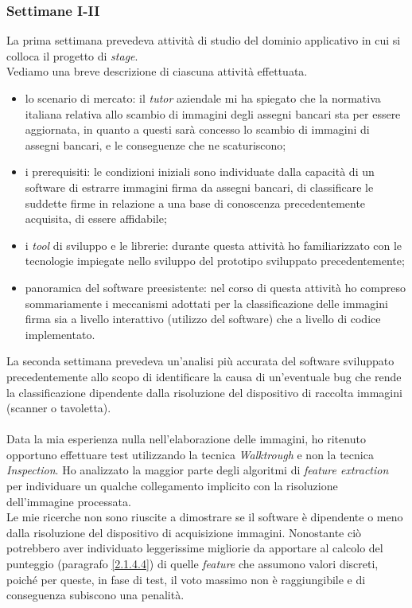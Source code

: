\subsubsection{Settimane I-II}
\label{3.1.1}
La prima settimana prevedeva attività di studio del dominio applicativo in cui si colloca il progetto di \emph{stage}.\\
Vediamo una breve descrizione di ciascuna attività effettuata.
\begin{itemize}
\item lo scenario di mercato: il \emph{tutor} aziendale mi ha spiegato che la normativa italiana relativa allo scambio di immagini degli assegni bancari sta per essere aggiornata, in quanto a questi sarà concesso lo scambio di immagini di assegni bancari, e le conseguenze che ne scaturiscono;
\item i prerequisiti: le condizioni iniziali sono individuate dalla capacità di un software di estrarre immagini firma da assegni bancari, di classificare le suddette firme in relazione a una base di conoscenza precedentemente acquisita, di essere affidabile;
\item i \emph{tool} di sviluppo e le librerie: durante questa attività ho familiarizzato con le tecnologie impiegate nello sviluppo del prototipo sviluppato precedentemente;
\item panoramica del software preesistente: nel corso di questa attività ho compreso sommariamente i meccanismi adottati per la classificazione delle immagini firma sia a livello interattivo (utilizzo del software) che a livello di codice implementato.
\end{itemize}
La seconda settimana prevedeva un'analisi più accurata del software sviluppato precedentemente allo scopo di identificare la causa di un'eventuale bug che rende la classificazione dipendente dalla risoluzione del dispositivo di raccolta immagini (scanner o tavoletta).\\\\
Data la mia esperienza nulla nell'elaborazione delle immagini, ho ritenuto opportuno effettuare test utilizzando la tecnica \emph{Walktrough} e non la tecnica \emph{Inspection}. Ho analizzato la maggior parte degli algoritmi di \emph{feature extraction} per individuare un qualche collegamento implicito con la risoluzione dell'immagine processata.\\Le mie ricerche non sono riuscite a dimostrare se il software è dipendente o meno dalla risoluzione del dispositivo di acquisizione immagini. Nonostante ciò potrebbero aver individuato leggerissime migliorie da apportare al calcolo del punteggio (paragrafo \ref{2.1.4.4}) di quelle \emph{feature} che assumono valori discreti, poiché per queste, in fase di test, il voto massimo non è raggiungibile e di conseguenza subiscono una penalità.
